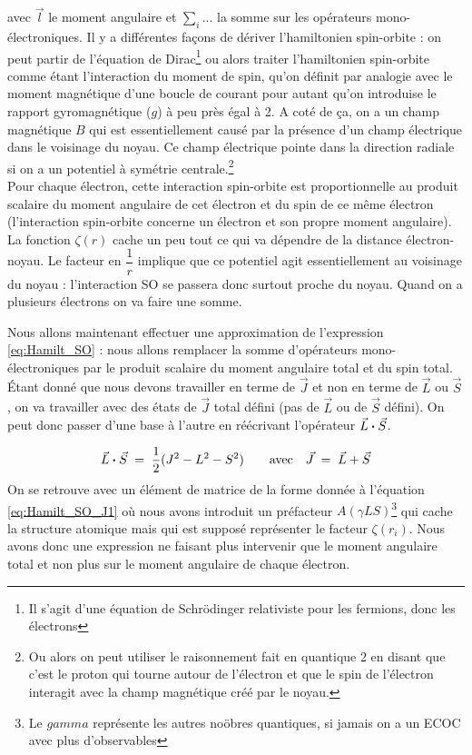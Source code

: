 avec $\vec{l}$ le moment angulaire et $\sum_i...$ la somme sur les opérateurs mono-électroniques. Il y a différentes façons de dériver l’hamiltonien spin-orbite : on peut partir de l’équation de Dirac\footnote{Il s'agit d'une équation de Schrödinger relativiste pour les fermions, donc les électrons} ou alors traiter l’hamiltonien spin-orbite comme étant l’interaction du moment de spin, qu’on définit par analogie avec le moment magnétique d’une boucle de courant pour autant qu’on introduise le rapport gyromagnétique ($g$) à peu près égal à 2. A coté de ça, on a un champ magnétique $B$ qui est essentiellement causé par la présence d’un champ électrique dans le voisinage du noyau. Ce champ électrique pointe dans la direction radiale si on a un potentiel à symétrie centrale.\footnote{Ou alors on peut utiliser le raisonnement fait en quantique 2 en disant que c'est le proton qui tourne autour de l'électron et que le spin de l'électron interagit avec la champ magnétique créé par le noyau.}\\

Pour chaque électron, cette interaction spin-orbite est proportionnelle au produit scalaire du moment angulaire de cet électron et du spin de ce même électron (l'interaction spin-orbite concerne un électron et son propre moment angulaire). La fonction $\zeta(r)$ cache un peu tout ce qui va dépendre de la distance électron-noyau. Le facteur en $\dfrac{1}{r}$ implique que ce potentiel agit essentiellement au voisinage du noyau : l'interaction SO se passera donc surtout proche du noyau. Quand on a plusieurs électrons on va faire une somme.

Nous allons maintenant effectuer une approximation de l'expression \eqref{eq:Hamilt_SO} : nous allons remplacer la somme d’opérateurs mono-électroniques par le produit scalaire du moment angulaire total et du spin total. Étant donné que nous devons travailler en terme de $\vec{J}$ et non en terme de $\vec{L}$ ou $\vec{S}$, on va travailler avec des états de $\vec{J}$ total défini (pas de $\vec{L}$ ou de $\vec{S}$ défini). On peut donc passer d’une base à l’autre en réécrivant l’opérateur $\vec{L}\boldsymbol{\cdot}\vec{S}$.

\begin{equation}
    \vec{L}\boldsymbol{\cdot}\vec{S} \; = \;  \dfrac{1}{2}(J^2-L^2-S^2) \qquad \mathrm{avec} \quad \vec{J} \; = \;  \vec{L}+\vec{S}
    \label{eq:JLS}
\end{equation}
On se retrouve avec un élément de matrice de la forme donnée à l'équation \eqref{eq:Hamilt_SO_J1} où nous avons introduit un préfacteur $A(\gamma L S)$\footnote{Le $gamma$ représente les autres noöbres quantiques, si jamais on a un ECOC avec plus d'observables} qui cache la structure atomique mais qui est supposé représenter le facteur $\zeta(r_i)$. Nous avons donc une expression ne faisant plus intervenir que le moment angulaire total et non plus sur le moment angulaire de chaque électron.

